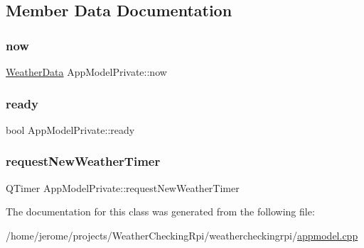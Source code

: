 \subsection{Member Data Documentation}
\mbox{\label{class_app_model_private_adacce6c96a2a7b0b825586a63a15bcac}} 
\subsubsection{\texorpdfstring{now}{now}}
{\footnotesize\ttfamily \hyperlink{class_weather_data}{Weather\+Data} App\+Model\+Private\+::now}

\mbox{\label{class_app_model_private_ab0434f387adadf9ed65183496fe80f77}} 
\subsubsection{\texorpdfstring{ready}{ready}}
{\footnotesize\ttfamily bool App\+Model\+Private\+::ready}

\mbox{\label{class_app_model_private_ad073c8bcf6739fd658009860e12aa72c}} 
\subsubsection{\texorpdfstring{request\+New\+Weather\+Timer}{requestNewWeatherTimer}}
{\footnotesize\ttfamily Q\+Timer App\+Model\+Private\+::request\+New\+Weather\+Timer}



The documentation for this class was generated from the following file\+:\begin{DoxyCompactItemize}
\item 
/home/jerome/projects/\+Weather\+Checking\+Rpi/weathercheckingrpi/\hyperlink{appmodel_8cpp}{appmodel.\+cpp}\end{DoxyCompactItemize}
